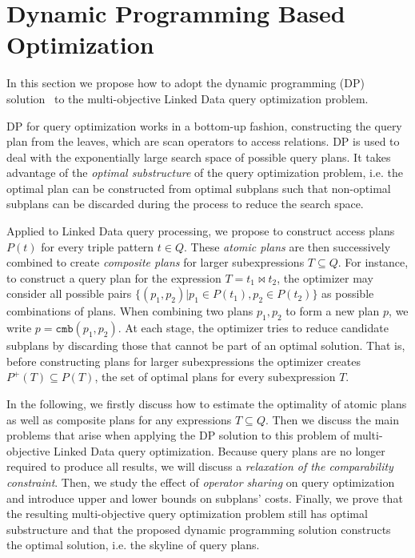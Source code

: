 \section{Dynamic Programming Based Optimization}
\label{sec:opt}
In this section we propose how to adopt the dynamic
programming (DP) solution~\cite{selinger_access_1979} to the 
multi-objective Linked Data query optimization problem. 

DP for query optimization works in a bottom-up fashion, constructing
the query plan from the leaves, which are scan operators to access
relations. DP is used to deal with the exponentially large search
space of possible query plans. It takes advantage of the \emph{optimal
  substructure} of the query optimization problem, i.e. the optimal
plan can be constructed from optimal subplans such that non-optimal
subplans can be discarded during the process to reduce the search
space.


Applied to Linked Data query processing, we propose to construct
access plans $P(t)$ for every triple pattern $t \in Q$. These
\emph{atomic plans} are then successively combined
to create \emph{composite plans} for larger subexpressions $T
\subseteq Q$.  For instance, to construct a query plan for the
expression $T=t_1\Join t_2$, the optimizer may consider all possible
pairs $\{(p_1,p_2) | p_1 \in P(t_1),p_2 \in P(t_2)\}$ as possible
combinations of plans. When combining two plans $p_1,p_2$ to form a
new plan $p$, we write $p = \mathtt{cmb}(p_1,p_2)$. At each stage, the
optimizer tries to reduce candidate subplans by discarding those that
cannot be part of an optimal solution. That is, before constructing
plans for larger subexpressions the optimizer creates $P^+(T)
\subseteq P(T)$, the set of optimal plans for every subexpression $T$.


In the following, we firstly discuss how to estimate the optimality of atomic plans as well as composite plans for any expressions $T \subseteq Q$. Then we discuss the main problems that arise when applying the DP solution to this problem of multi-objective Linked Data query optimization.  Because query plans are no longer required to produce all results, we will
discuss a \emph{relaxation of the comparability constraint}. Then, we study the effect of \emph{operator sharing} on query optimization and introduce upper and lower bounds on subplans'
costs. Finally, we prove that the resulting multi-objective query optimization problem still has optimal
substructure and that the proposed dynamic programming solution constructs the
optimal solution, i.e. the skyline of query plans.

